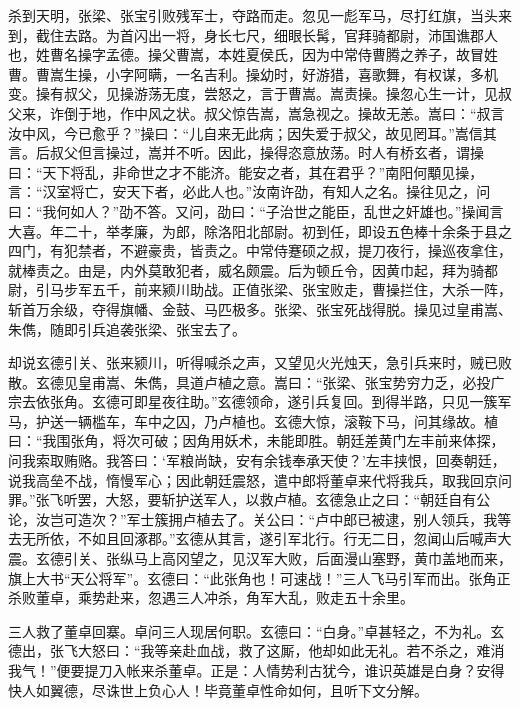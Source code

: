 杀到天明，张梁、张宝引败残军士，夺路而走。忽见一彪军马，尽打红旗，当头来到，截住去路。为首闪出一将，身长七尺，细眼长髯，官拜骑都尉，沛国谯郡人也，姓曹名操字孟德。操父曹嵩，本姓夏侯氏，因为中常侍曹腾之养子，故冒姓曹。曹嵩生操，小字阿瞒，一名吉利。操幼时，好游猎，喜歌舞，有权谋，多机变。操有叔父，见操游荡无度，尝怒之，言于曹嵩。嵩责操。操忽心生一计，见叔父来，诈倒于地，作中风之状。叔父惊告嵩，嵩急视之。操故无恙。嵩曰：“叔言汝中风，今已愈乎？”操曰：“儿自来无此病；因失爱于叔父，故见罔耳。”嵩信其言。后叔父但言操过，嵩并不听。因此，操得恣意放荡。时人有桥玄者，谓操曰：“天下将乱，非命世之才不能济。能安之者，其在君乎？”南阳何顒见操，言：“汉室将亡，安天下者，必此人也。”汝南许劭，有知人之名。操往见之，问曰：“我何如人？”劭不答。又问，劭曰：“子治世之能臣，乱世之奸雄也。”操闻言大喜。年二十，举孝廉，为郎，除洛阳北部尉。初到任，即设五色棒十余条于县之四门，有犯禁者，不避豪贵，皆责之。中常侍蹇硕之叔，提刀夜行，操巡夜拿住，就棒责之。由是，内外莫敢犯者，威名颇震。后为顿丘令，因黄巾起，拜为骑都尉，引马步军五千，前来颍川助战。正值张梁、张宝败走，曹操拦住，大杀一阵，斩首万余级，夺得旗幡、金鼓、马匹极多。张梁、张宝死战得脱。操见过皇甫嵩、朱儁，随即引兵追袭张梁、张宝去了。

却说玄德引关、张来颍川，听得喊杀之声，又望见火光烛天，急引兵来时，贼已败散。玄德见皇甫嵩、朱儁，具道卢植之意。嵩曰：“张梁、张宝势穷力乏，必投广宗去依张角。玄德可即星夜往助。”玄德领命，遂引兵复回。到得半路，只见一簇军马，护送一辆槛车，车中之囚，乃卢植也。玄德大惊，滚鞍下马，问其缘故。植曰：“我围张角，将次可破；因角用妖术，未能即胜。朝廷差黄门左丰前来体探，问我索取贿赂。我答曰：‘军粮尚缺，安有余钱奉承天使？’左丰挟恨，回奏朝廷，说我高垒不战，惰慢军心；因此朝廷震怒，遣中郎将董卓来代将我兵，取我回京问罪。”张飞听罢，大怒，要斩护送军人，以救卢植。玄德急止之曰：“朝廷自有公论，汝岂可造次？”军士簇拥卢植去了。关公曰：“卢中郎已被逮，别人领兵，我等去无所依，不如且回涿郡。”玄德从其言，遂引军北行。行无二日，忽闻山后喊声大震。玄德引关、张纵马上高冈望之，见汉军大败，后面漫山塞野，黄巾盖地而来，旗上大书“天公将军”。玄德曰：“此张角也！可速战！”三人飞马引军而出。张角正杀败董卓，乘势赴来，忽遇三人冲杀，角军大乱，败走五十余里。

三人救了董卓回寨。卓问三人现居何职。玄德曰：“白身。”卓甚轻之，不为礼。玄德出，张飞大怒曰：“我等亲赴血战，救了这厮，他却如此无礼。若不杀之，难消我气！”便要提刀入帐来杀董卓。正是：人情势利古犹今，谁识英雄是白身？安得快人如翼德，尽诛世上负心人！毕竟董卓性命如何，且听下文分解。